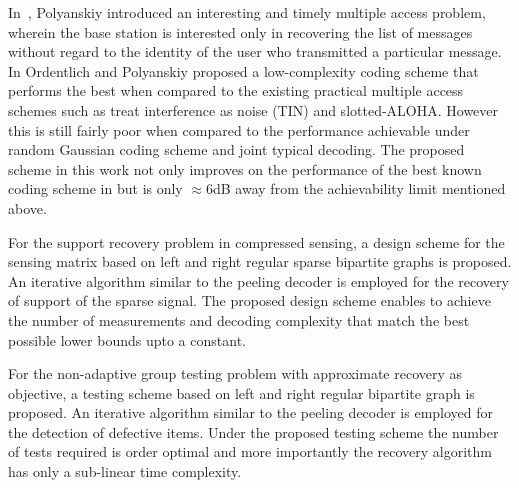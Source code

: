 In~\cite{polyanskiy2017perspective}, Polyanskiy introduced an interesting and timely multiple access problem, wherein the base station is interested only in recovering the list of messages without regard to the identity of the user who transmitted a particular message. In \cite{ordentlich2017low} Ordentlich and Polyanskiy proposed a low-complexity coding scheme that performs the best when compared to the existing practical multiple access schemes such as treat interference as noise (TIN) and slotted-ALOHA. However this is still fairly poor when compared to the performance achievable under random Gaussian coding scheme and joint typical decoding. The proposed scheme in this work not only improves on the performance of the best known coding scheme in \cite{ordentlich2017low} but is only $\approx 6$dB away from the achievability limit mentioned above.

For the support recovery problem in compressed sensing, a design scheme for the sensing matrix based on left and right regular sparse bipartite graphs is proposed. An iterative algorithm similar to the peeling decoder is employed for the recovery of support of the sparse signal. The proposed design scheme enables to achieve the number of measurements and decoding complexity that match the best possible lower bounds upto a constant.

For the non-adaptive group testing problem with approximate recovery as objective, a testing scheme based on left and right regular bipartite graph is proposed. An iterative algorithm similar to the peeling decoder is employed for the detection of defective items. Under the proposed testing scheme the number of tests required is order optimal and more importantly the recovery algorithm has only a sub-linear time complexity.
\pagebreak{}
